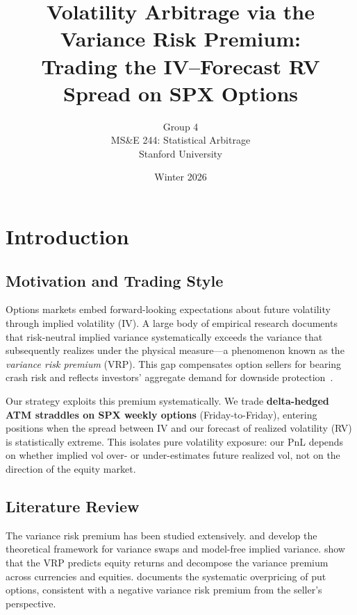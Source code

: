 \documentclass[11pt,a4paper]{article}
\title{
    \vspace{-1cm}
    \textbf{Volatility Arbitrage via the Variance Risk Premium:} \\[4pt]
    \large Trading the IV--Forecast RV Spread on SPX Options
}
\author{
    Group 4 \\
    MS\&E 244: Statistical Arbitrage \\
    Stanford University
}
\date{Winter 2026}
\begin{document}
\maketitle
\thispagestyle{fancy}

\section{Introduction}

\subsection{Motivation and Trading Style}

Options markets embed forward-looking expectations about future volatility through implied volatility (IV).
A large body of empirical research documents that risk-neutral implied variance systematically exceeds the variance that subsequently realizes under the physical measure---a phenomenon known as the \emph{variance risk premium} (VRP).
This gap compensates option sellers for bearing crash risk and reflects investors' aggregate demand for downside protection~\citep{bollerslev2009expected, carr2009variance}.

Our strategy exploits this premium systematically.
We trade \textbf{delta-hedged ATM straddles on SPX weekly options} (Friday-to-Friday), entering positions when the spread between IV and our forecast of realized volatility (RV) is statistically extreme.
This isolates pure volatility exposure: our PnL depends on whether implied vol over- or under-estimates future realized vol, not on the direction of the equity market.

\subsection{Literature Review}

The variance risk premium has been studied extensively.
\citet{carr1998towards} and \citet{demeterfi1999more} develop the theoretical framework for variance swaps and model-free implied variance.
\citet{bollerslev2009expected} show that the VRP predicts equity returns and \citet{carr2009variance} decompose the variance premium across currencies and equities.
\citet{bondarenko2003why} documents the systematic overpricing of put options, consistent with a negative variance risk premium from the seller's perspective.
\end{document}
